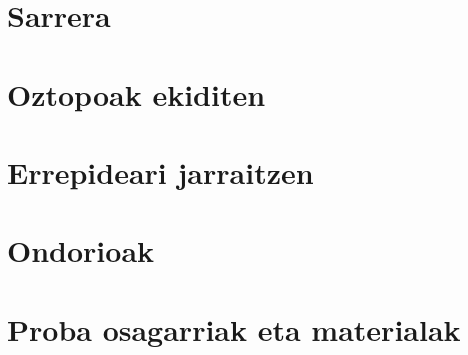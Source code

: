 \documentclass[a4paper, 11pt, oneside]{memoir}
\title{\izenburua}
\author{\egileak}
\date{\data}
\begin{document}

\clearpage

\frontmatter
{}
\pagestyle{plain}

\begin{KeepFromToc}
  \tableofcontents
\end{KeepFromToc}
\clearpage
\listoffigures
\clearpage
\listoftables

\clearpage
\mainmatter
\pagestyle{ruled}

\chapter{Sarrera}\label{ch:sarrera}


\chapter{Oztopoak ekiditen}\label{ch:oztopoak}


\chapter{Errepideari jarraitzen}\label{ch:errepidea}


\chapter{Ondorioak}\label{ch:ondorioak}


\appendix
\chapter{Proba osagarriak eta materialak}\label{ch:eranskina}




\end{document}
